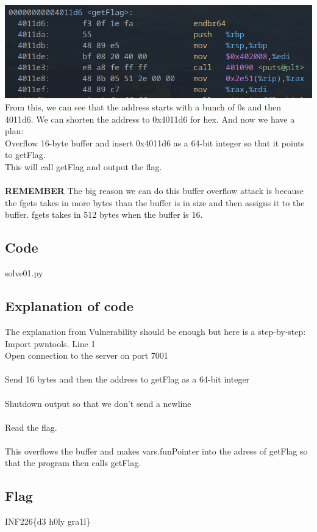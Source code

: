 \documentclass{article}
\begin{document}
\includegraphics[scale=0.5]{objdump-01.png}\\
From this, we can see that the address starts with a bunch of 0s and then 4011d6. We can shorten the address to 0x4011d6 for hex. And now we have a plan: \\
Overflow 16-byte buffer and insert 0x4011d6 as a 64-bit integer so that it points to getFlag.\\
This will call getFlag and output the flag. \\ \\

\textbf{REMEMBER} The big reason we can do this buffer overflow attack is because the fgets takes in more bytes than the buffer is in size and then assigns it to the buffer. fgets takes in 512 bytes when the buffer is 16.

\subsection{Code}

{solve01.py}
\subsection{Explanation of code}
The explanation from Vulnerability should be enough but here is a step-by-step: \\
Import pwntools. Line 1 \\
Open connection to the server on port 7001 \\ \\
Send 16 bytes and then the address to getFlag as a 64-bit integer \\ \\
Shutdown output so that we don't send a newline \\ \\
Read the flag. \\ \\
This overflows the buffer and makes vars.funPointer into the adress of getFlag so that the program then calls getFlag.

\subsection{Flag}
INF226\{d3 h0ly gra1l\}
\end{document}
